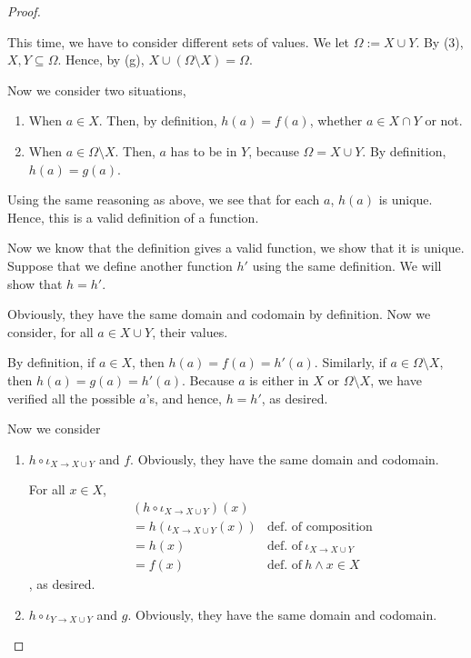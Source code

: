 \begin{proof}
\begin{enumerate}
		This time, we have to consider different sets of values. We let $\Omega := X \cup Y$. By  (3), $X,Y \subseteq \Omega$. Hence, by  (g), $X \cup (\Omega \setminus X) = \Omega$.
		
		Now we consider two situations,
		\begin{enumerate}
			\item When $a \in X$. Then, by definition, $h(a) = f(a)$, whether $a \in X \cap Y$ or not.
			\item When $a \in \Omega \setminus X$. Then, $a$ has to be in $Y$, because $\Omega = X \cup Y$. By definition, $h(a) = g(a)$.
		\end{enumerate}
		Using the same reasoning as above, we see that for each $a$, $h(a)$ is unique. Hence, this is a valid definition of a function.
		
		 Now we know that the definition gives a valid function, we show that it is unique. Suppose that we define another function $h'$ using the same definition. We will show that $h = h'$.
		
		Obviously, they have the same domain and codomain by definition. Now we consider, for all $a \in X \cup Y$, their values. 
		
		By definition, if $a \in X$, then $h(a) = f(a) = h'(a)$. Similarly, if $a \in \Omega \setminus X$, then $h(a) = g(a) = h'(a)$. Because $a$ is either in $X$ or $\Omega \setminus X$, we have verified all the possible $a$'s, and hence, $h = h'$, as desired.
		
		 Now we consider
		\begin{enumerate}
			\item $h \circ \iota_{X \to X \cup Y}$ and $f$. Obviously, they have the same domain and codomain.
			
			For all $x \in X$, 
			\begin{align*}
				&(h \circ \iota_{X \to X \cup Y})(x) \\
				&= h(\iota_{X \to X \cup Y}(x)) 	&\text{def.~of composition}\\
				&= h(x) 							&\text{def.~of}\ \iota_{X \to X \cup Y}\\
				&= f(x)								&\text{def.~of}\ h \wedge x \in X
			\end{align*}
			, as desired.
			
			\item $h \circ \iota_{Y \to X \cup Y}$ and $g$. Obviously, they have the same domain and codomain.
			

\end{enumerate}
\end{enumerate}
\end{proof}
